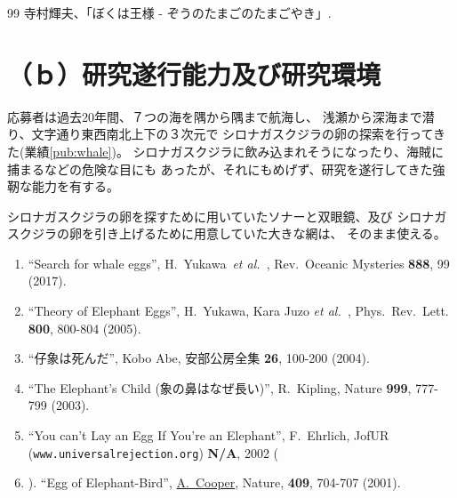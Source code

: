 \documentclass[11pt,a4j,dvipdfmx]{jarticle} 					%
\newcommand{\研究課題名}{象の卵}
\newcommand{\研究機関名}{逢坂大学}
\newcommand{\研究代表者氏名}{湯川秀樹}
\newcommand{\研究期間の最終元号年度}{6}  %
\newcommand{\paper}[6]{%
	\item ``#1'', #2, #3 {\bf #4}, #5 (#6).			%
}
\newcommand{\etal}{\textit{et al.\ }}
\newcommand{\yukawa}{H.~Yukawa}					%
\newcommand{\prl}{Phys.\ Rev.\ Lett.\ }		%
\begin{document}
	\vspace{1cm}
	\begin{thebibliography}{99}
		 寺村輝夫、「ぼくは王様 - ぞうのたまごのたまごやき」.
	\end{thebibliography}




\section{ （ｂ）研究遂行能力及び研究環境}

\PapersInstructions	%

	応募者は過去20年間、７つの海を隅から隅まで航海し、
	浅瀬から深海まで潜り、文字通り東西南北上下の３次元で
	シロナガスクジラの卵の探索を行ってきた(業績\ref{pub:whale})。
	シロナガスクジラに飲み込まれそうになったり、海賊に捕まるなどの危険な目にも
	あったが、それにもめげず、研究を遂行してきた強靭な能力を有する。

	シロナガスクジラの卵を探すために用いていたソナーと双眼鏡、及び
	シロナガスクジラの卵を引き上げるために用意していた大きな網は、
	そのまま使える。
	\begin{enumerate}
		\paper{Search for whale eggs}{\yukawa\ \etal}{Rev.\ Oceanic Mysteries}{888}{99}{2017}
			\label{pub:whale}
				
		\paper{Theory of Elephant Eggs}{\yukawa, Kara Juzo \etal}{\prl}{800}{800-804}{2005}
			\label{pub:theoegg}
				
		\paper{仔象は死んだ}{Kobo Abe}{安部公房全集}{26}{100-200}{2004}
		
		\paper{The Elephant's Child (象の鼻はなぜ長い)}{R.~Kipling}{Nature}{999}{777-799}{2003}

		\paper{You can't Lay an Egg If You're an Elephant}{F.~Ehrlich}
			{JofUR\\({\tt www.universalrejection.org})}{{\bf N/A}}{2002}
		
		\item ``Egg of Elephant-Bird'', 
				\underline{A.~Cooper},
				Nature, {\bf 409}, 704-707 (2001).	%
	\end{enumerate}
\end{document}
